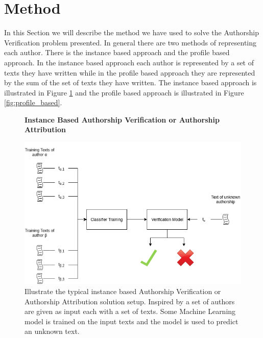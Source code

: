 \section{Method} \label{sec:method}

In this Section we will describe the method we have used to solve the Authorship
Verification problem presented. In general there are two methods of representing
each author. There is the instance based approach and the profile based
approach. In the instance based approach each author is represented by a set of
texts they have written while in the profile based approach they are represented
by the sum of the set of texts they have written. The instance based approach is
illustrated in Figure \ref{fig:instance_based} and the profile based approach is
illustrated in Figure \ref{fig:profile_based}.

\begin{figure}[htb]
    \centering
    \textbf{Instance Based Authorship Verification or Authorship Attribution}\par\medskip
    \includegraphics[scale=0.5]{./pictures/method/InstanceBased.png} 
    \caption{Illustrate the typical instance based Authorship Verification or
    Authorship Attribution solution setup. Inspired by \cite{stamatos2009} a
    set of authors are given as input each with a set of texts. Some Machine
    Learning model is trained on the input texts and the model is used to
    predict an unknown text. }

    \label{fig:instance_based}
\end{figure}

